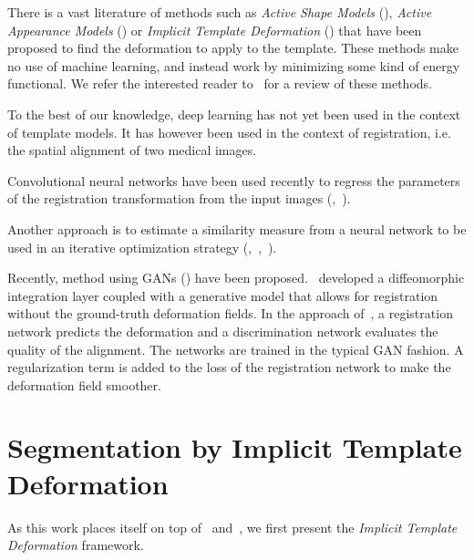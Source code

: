 There is a vast literature of methods such as \textit{Active Shape Models} (\textcite{cootes1995}), \textit{Active Appearance Models} (\textcite{cootes1998ECCV}) or \textit{Implicit Template Deformation} (\textcite{saddi2007}) that have been proposed to find the deformation to apply to the template. These methods make no use of machine learning, and instead work by minimizing some kind of energy functional. 
We refer the interested reader to~\textcite{heimann2009} for a review of these methods.

To the best of our knowledge, deep learning has not yet been used in the context of template models. It has however been used in the context of registration, i.e. the spatial alignment of two medical images.

Convolutional neural networks have been used recently to regress the parameters of the registration transformation from the input images (\textcite{miao2016},~\textcite{yang2016}).

Another approach is to estimate a similarity measure from a neural network to be used in an iterative optimization strategy (\textcite{wu2013MICCAI},~\textcite{cheng2015},~\textcite{simonovosky2016MICCAI}).

Recently, method using GANs (\textcite{goodfellow2014}) have been proposed.~\textcite{dalca2018MICCAI} developed a diffeomorphic integration layer coupled with a generative model that allows for registration without the ground-truth deformation fields. In the approach of~\textcite{fan2018MICCAI}, a registration network predicts the deformation and a discrimination network evaluates the quality of the alignment. The networks are trained in the typical GAN fashion. A regularization term is added to the loss of the registration network to make the deformation field smoother.

\section{Segmentation by Implicit Template Deformation}
\label{sec:implicit}

As this work places itself on top of~\textcite{mory2012MICCAI} and~\textcite{prevost2013PHD}, we first present the \textit{Implicit Template Deformation} framework. 

